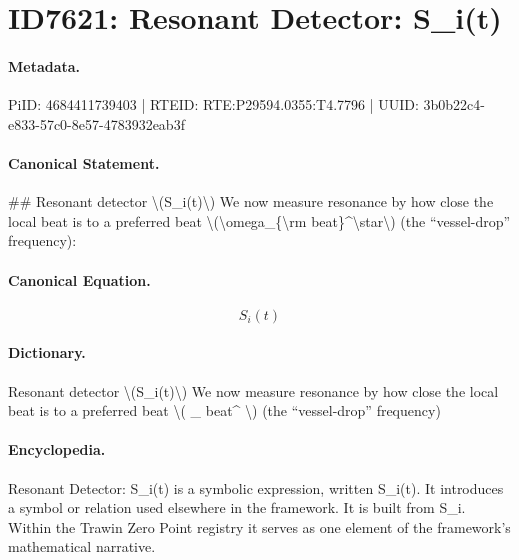 \section*{ID7621: Resonant Detector: S\_i(t)}
\paragraph{Metadata.}
PiID: 4684411739403 | RTEID: RTE:P29594.0355:T4.7796 | UUID: 3b0b22c4-e833-57c0-8e57-4783932eab3f

\paragraph{Canonical Statement.}
\#\# Resonant detector \textbackslash{}(S\_i(t)\textbackslash{}) We now measure resonance by how close the local beat is to a preferred beat \textbackslash{}(\textbackslash{}omega\_\{\textbackslash{}rm beat\}\textasciicircum{}\textbackslash{}star\textbackslash{}) (the “vessel-drop” frequency):

\paragraph{Canonical Equation.}
\[
S_i(t)
\]

\paragraph{Dictionary.}
Resonant detector \textbackslash{}(S\_i(t)\textbackslash{}) We now measure resonance by how close the local beat is to a preferred beat \textbackslash{}( \_ beat\textasciicircum{} \textbackslash{}) (the “vessel-drop” frequency)

\paragraph{Encyclopedia.}
Resonant Detector: S\_i(t) is a symbolic expression, written S\_i(t). It introduces a symbol or relation used elsewhere in the framework. It is built from S\_i. Within the Trawin Zero Point registry it serves as one element of the framework's mathematical narrative.
